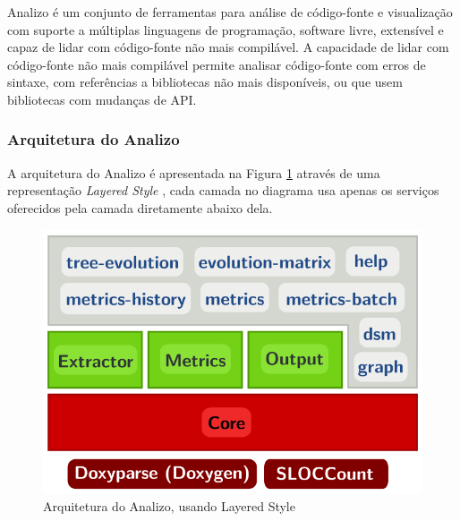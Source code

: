 Analizo é um conjunto de ferramentas para análise de código-fonte e
visualização com suporte a múltiplas linguagens de programação, software livre,
extensível e capaz de lidar com código-fonte não mais compilável. A capacidade
de lidar com código-fonte não mais compilável permite analisar código-fonte
com erros de sintaxe, com referências a bibliotecas não mais disponíveis, ou
que usem bibliotecas com mudanças de API.


\subsubsection{Arquitetura do Analizo}

A arquitetura do Analizo é apresentada na Figura \ref{arquitetura-analizo}
através de uma representação {\it Layered Style} \cite{Clements2002}, cada
camada no diagrama usa apenas os serviços oferecidos pela camada diretamente
abaixo dela.

\begin{figure}[h]
\center
\includegraphics[scale=0.3]{imagens/analizo-architecture.png}
\caption{Arquitetura do Analizo, usando Layered Style \cite{Clements2002}}
\label{arquitetura-analizo}
\end{figure}


